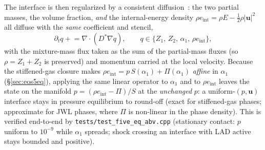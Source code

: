 \documentclass[11pt]{article}
\newcommand{\uvec}{\mathbf{u}}
\newcommand{\code}[1]{\texttt{#1}}
\begin{document}
The interface is then regularized by a consistent diffusion~\cite{cook_2009}: the
two partial masses, the volume fraction, \emph{and} the internal-energy density
$\rho e_{\mathrm{int}}=\rho E-\tfrac12\rho|\uvec|^2$ all diffuse with the
\emph{same} coefficient and stencil,
\begin{equation}
\partial_t q \mathrel{+}= \nabla\!\cdot(D^\ast\nabla q),
\qquad q\in\{Z_1,\,Z_2,\,\alpha_1,\,\rho e_{\mathrm{int}}\},
\end{equation}
with the mixture-mass flux taken as the sum of the partial-mass fluxes (so
$\rho=Z_1+Z_2$ is preserved) and momentum carried at the local velocity. Because
the stiffened-gas closure makes $\rho e_{\mathrm{int}}=p\,S(\alpha_1)+\Pi(\alpha_1)$
\emph{affine} in $\alpha_1$ (\S\ref{sec:eos5eq}), applying the same linear operator
to $\alpha_1$ and to $\rho e_{\mathrm{int}}$ leaves the state on the manifold
$p=(\rho e_{\mathrm{int}}-\Pi)/S$ at the \emph{unchanged} $p$: a uniform-$(p,\uvec)$
interface stays in pressure equilibrium to round-off (exact for stiffened-gas
phases; approximate for JWL phases, where $\Pi$ is non-linear in the phase
density). This is verified end-to-end by \code{tests/test\_five\_eq\_abv.cpp}
(stationary contact: $p$ uniform to $10^{-9}$ while $\alpha_1$ spreads; shock
crossing an interface with LAD active stays bounded and positive).
\end{document}
